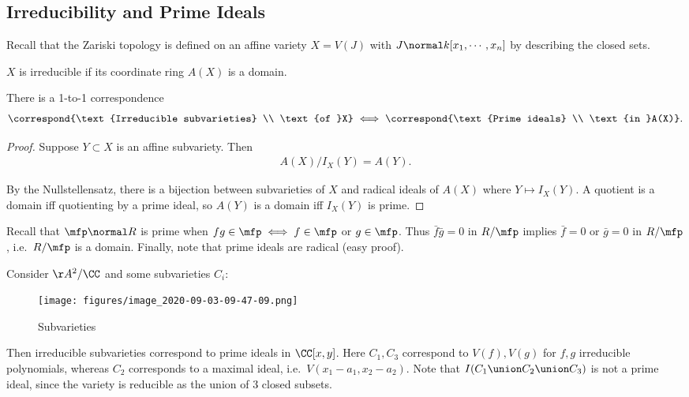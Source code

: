 \hypertarget{irreducibility-and-prime-ideals}{%
\subsection{Irreducibility and Prime
Ideals}\label{irreducibility-and-prime-ideals}}

Recall that the Zariski topology is defined on an affine variety
\(X = V(J)\) with \(J \normal k[x_1, \cdots, x_n]\) by describing the
closed sets.

\begin{proposition}[?]

\(X\) is irreducible if its coordinate ring \(A(X)\) is a domain.

\end{proposition}

\begin{proposition}[?]

There is a 1-to-1 correspondence
\begin{align*}  
\correspond{\text{Irreducible subvarieties} \\ \text{of }X}
\iff
\correspond{\text{Prime ideals} \\ \text{in }A(X)}
.\end{align*}

\end{proposition}

\begin{proof}

Suppose \(Y\subset X\) is an affine subvariety. Then
\begin{align*}  
A(X) / I_X(Y) = A(Y)
.\end{align*}

By the Nullstellensatz, there is a bijection between subvarieties of
\(X\) and radical ideals of \(A(X)\) where \(Y\mapsto I_X(Y)\). A
quotient is a domain iff quotienting by a prime ideal, so \(A(Y)\) is a
domain iff \(I_X(Y)\) is prime.

\end{proof}

Recall that \(\mfp \normal R\) is prime when
\(fg\in \mfp \iff f\in \mfp\) or \(g\in \mfp\). Thus
\(\bar f \bar g = 0\) in \(R/\mfp\) implies \(\bar f = 0\) or
\(\bar g = 0\) in \(R/\mfp\), i.e.~\(R/\mfp\) is a domain. Finally, note
that prime ideals are radical (easy proof).

\begin{example}

Consider \(\AA^2/\CC\) and some subvarieties \(C_i\):

\begin{figure}
\centering
\texttt{[image: figures/image\_2020-09-03-09-47-09.png]}
\caption{Subvarieties}
\end{figure}

Then irreducible subvarieties correspond to prime ideals in
\(\CC[x, y]\). Here \(C_1, C_3\) correspond to \(V(f), V(g)\) for
\(f,g\) irreducible polynomials, whereas \(C_2\) corresponds to a
maximal ideal, i.e.~\(V(x_1 - a_1, x_2 - a_2)\). Note that
\(I(C_1 \union C_2 \union C_3)\) is not a prime ideal, since the variety
is reducible as the union of 3 closed subsets.

\end{example}

